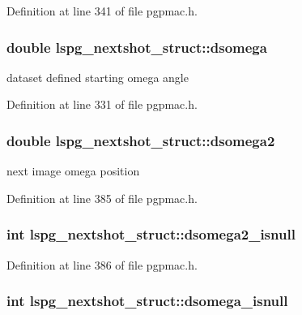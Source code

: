 Definition at line 341 of file pgpmac.\-h.

\hypertarget{structlspg__nextshot__struct_a4be525bb32fb0232c21a91529f1e8c73}{
\subsubsection[{dsomega}]{\setlength{\rightskip}{0pt plus 5cm}double lspg\-\_\-nextshot\-\_\-struct\-::dsomega}}\label{structlspg__nextshot__struct_a4be525bb32fb0232c21a91529f1e8c73}


dataset defined starting omega angle 



Definition at line 331 of file pgpmac.\-h.

\hypertarget{structlspg__nextshot__struct_a84ae35abfa725d1bdbff5403f6384ee4}{
\subsubsection[{dsomega2}]{\setlength{\rightskip}{0pt plus 5cm}double lspg\-\_\-nextshot\-\_\-struct\-::dsomega2}}\label{structlspg__nextshot__struct_a84ae35abfa725d1bdbff5403f6384ee4}


next image omega position 



Definition at line 385 of file pgpmac.\-h.

\hypertarget{structlspg__nextshot__struct_afaf9bdf89a68e7f479969072643e55eb}{
\subsubsection[{dsomega2\-\_\-isnull}]{\setlength{\rightskip}{0pt plus 5cm}int lspg\-\_\-nextshot\-\_\-struct\-::dsomega2\-\_\-isnull}}\label{structlspg__nextshot__struct_afaf9bdf89a68e7f479969072643e55eb}


Definition at line 386 of file pgpmac.\-h.

\hypertarget{structlspg__nextshot__struct_ad1da3548dc642d415aed53dc165c44fc}{
\subsubsection[{dsomega\-\_\-isnull}]{\setlength{\rightskip}{0pt plus 5cm}int lspg\-\_\-nextshot\-\_\-struct\-::dsomega\-\_\-isnull}}\label{structlspg__nextshot__struct_ad1da3548dc642d415aed53dc165c44fc}


